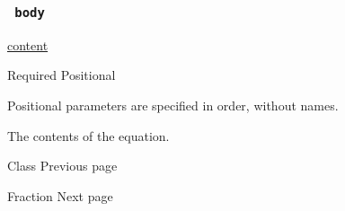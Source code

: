 \subsubsection{\texorpdfstring{\texttt{\ body\ }}{ body }}\label{parameters-body}

\href{/docs/reference/foundations/content/}{content}

{Required} {{ Positional }}

\label{parameters-body-positional-tooltip}
Positional parameters are specified in order, without names.

The contents of the equation.

\href{/docs/reference/math/class/}{\pandocbounded{}}

{ Class } { Previous page }

\href{/docs/reference/math/frac/}{\pandocbounded{}}

{ Fraction } { Next page }


